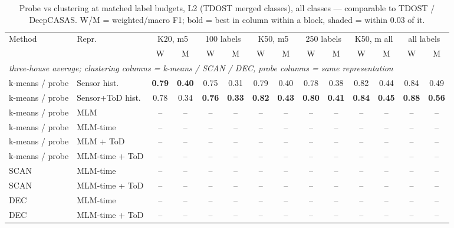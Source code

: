 \begin{table}[H]
\centering\small
\caption{Probe vs clustering at matched label budgets, L2 (TDOST merged classes), all classes --- comparable to TDOST / DeepCASAS. W/M = weighted/macro F1; bold = best in column within a block, shaded = within 0.03 of it.}
\label{tab:cmp_l2_all}
\setlength{\tabcolsep}{3.5pt}
\begin{tabular}{llcc|cc|cc|cc|cc|cc}
\toprule
Method & Repr. & \multicolumn{2}{c}{K20, m5} & \multicolumn{2}{c}{100 labels} & \multicolumn{2}{c}{K50, m5} & \multicolumn{2}{c}{250 labels} & \multicolumn{2}{c}{K50, m all} & \multicolumn{2}{c}{all labels} \\
\cmidrule(lr){3-4}\cmidrule(lr){5-6}\cmidrule(lr){7-8}\cmidrule(lr){9-10}\cmidrule(lr){11-12}\cmidrule(lr){13-14}
 & & W & M & W & M & W & M & W & M & W & M & W & M \\
\midrule
\multicolumn{14}{l}{\textit{three-house average; clustering columns = k-means / SCAN / DEC, probe columns = same representation}} \\
\midrule
k-means / probe & Sensor hist. & \cellcolor{blue!12}\textbf{0.79} & \cellcolor{blue!12}\textbf{0.40} & \cellcolor{blue!12}0.75 & \cellcolor{blue!12}0.31 & 0.79 & 0.40 & \cellcolor{blue!12}0.78 & \cellcolor{blue!12}0.38 & \cellcolor{blue!12}0.82 & \cellcolor{blue!12}0.44 & 0.84 & 0.49 \\
k-means / probe & Sensor+ToD hist. & \cellcolor{blue!12}0.78 & 0.34 & \cellcolor{blue!12}\textbf{0.76} & \cellcolor{blue!12}\textbf{0.33} & \cellcolor{blue!12}\textbf{0.82} & \cellcolor{blue!12}\textbf{0.43} & \cellcolor{blue!12}\textbf{0.80} & \cellcolor{blue!12}\textbf{0.41} & \cellcolor{blue!12}\textbf{0.84} & \cellcolor{blue!12}\textbf{0.45} & \cellcolor{blue!12}\textbf{0.88} & \cellcolor{blue!12}\textbf{0.56} \\
\cmidrule{1-14}
k-means / probe & MLM & -- & -- & -- & -- & -- & -- & -- & -- & -- & -- & -- & -- \\
k-means / probe & MLM-time & -- & -- & -- & -- & -- & -- & -- & -- & -- & -- & -- & -- \\
k-means / probe & MLM + ToD & -- & -- & -- & -- & -- & -- & -- & -- & -- & -- & -- & -- \\
k-means / probe & MLM-time + ToD & -- & -- & -- & -- & -- & -- & -- & -- & -- & -- & -- & -- \\
\cmidrule{1-14}
SCAN & MLM-time & -- & -- & -- & -- & -- & -- & -- & -- & -- & -- & -- & -- \\
SCAN & MLM-time + ToD & -- & -- & -- & -- & -- & -- & -- & -- & -- & -- & -- & -- \\
\cmidrule{1-14}
DEC & MLM-time & -- & -- & -- & -- & -- & -- & -- & -- & -- & -- & -- & -- \\
DEC & MLM-time + ToD & -- & -- & -- & -- & -- & -- & -- & -- & -- & -- & -- & -- \\
\bottomrule
\end{tabular}
\end{table}
